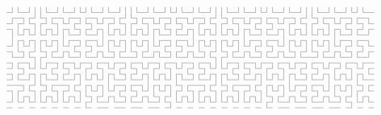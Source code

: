 \vskip 1cm
$$
\hbox
{
\vbox{\lineskip = 0pt \baselineskip = 0pt
      \hbox{\z\j\l\z\j\j\j\l\z\j\l\z\j\l\j\l\z\j\l\z\j\j\j\l\z\j\l\z\j\l\j\l\z\j\l\z\j\j\j\l\z\j\l\z\j\l\j\l\z\j\l\z\j\j\j\l\z\j\l\z\j\l\j\l\z}
      \hbox{\n\z\z\o\z\j\l\o\z\z\o\z\z\o\z\z\o\z\z\o\z\j\l\o\z\z\o\z\z\o\z\z\o\z\z\o\z\j\l\o\z\z\o\z\z\o\z\z\o\z\z\o\z\j\l\o\z\z\o\z\z\o\z\z\o}
      \hbox{\z\j\z\j\l\o\z\j\l\o\l\j\z\j\l\o\l\j\z\j\l\o\z\j\l\o\l\j\z\j\l\o\l\j\z\j\l\o\z\j\l\o\l\j\z\j\l\o\l\j\z\j\l\o\z\j\l\o\l\j\z\j\l\o\l}
      \hbox{\z\o\j\z\o\j\j\z\o\j\z\o\l\o\z\j\z\o\j\z\o\j\j\z\o\j\z\o\l\o\z\j\z\o\j\z\o\j\j\z\o\j\z\o\l\o\z\j\z\o\j\z\o\j\j\z\o\j\z\o\l\o\z\j\z}
      \hbox{\n\j\l\j\l\j\l\j\l\j\j\l\z\j\l\z\j\j\l\j\l\j\l\j\l\j\j\l\z\j\l\z\j\j\l\j\l\j\l\j\l\j\j\l\z\j\l\z\j\j\l\j\l\j\l\j\l\j\j\l\z\j\l\z\j}
      \hbox{\n\j\z\o\z\o\z\o\z\o\j\z\z\o\z\z\o\j\z\o\z\o\z\o\z\o\j\z\z\o\z\z\o\j\z\o\z\o\z\o\z\o\j\z\z\o\z\z\o\j\z\o\z\o\z\o\z\o\j\z\z\o\z\z\o}
      \hbox{\z\j\j\l\j\j\j\l\j\j\l\j\z\j\l\o\l\j\j\l\j\j\j\l\j\j\l\j\z\j\l\o\l\j\j\l\j\j\j\l\j\j\l\j\z\j\l\o\l\j\j\l\j\j\j\l\j\j\l\j\z\j\l\o\l}
      \hbox{\z\o\l\o\z\j\l\o\z\j\z\o\l\o\z\j\z\o\l\o\z\j\l\o\z\j\z\o\l\o\z\j\z\o\l\o\z\j\l\o\z\j\z\o\l\o\z\j\z\o\l\o\z\j\l\o\z\j\z\o\l\o\z\j\z}
      \hbox{\n\l\z\j\l\o\z\j\l\z\j\l\z\j\l\z\j\l\z\j\l\z\z\j\l\z\j\l\z\j\l\z\j\l\z\j\l\o\z\j\l\z\j\l\z\j\l\z\j\l\z\j\l\z\z\j\l\z\j\l\z\j\l\z\j}
      \hbox{\z\o\z\z\o\j\j\z\z\o\z\z\o\z\z\o\z\z\o\z\z\o\z\z\o\z\z\o\z\z\o\z\z\o\z\z\o\j\j\z\z\o\z\z\o\z\z\o\z\z\o\z\z\o\z\z\o\z\z\o\z\z\o\z\z}
      \hbox{\z\j\l\o\l\j\l\j\z\j\l\o\l\j\z\j\l\o\l\j\z\j\l\o\l\j\z\j\l\o\l\j\z\j\l\o\l\j\l\j\z\j\l\o\l\j\z\j\l\o\l\j\z\j\l\o\l\j\z\j\l\o\l\j\z}
      \hbox{\z\o\z\j\z\o\z\o\l\o\z\j\z\o\j\z\o\j\z\o\l\o\z\j\z\o\j\z\o\j\z\o\l\o\z\j\z\o\z\o\l\o\z\j\z\o\j\z\o\j\z\o\l\o\z\j\z\o\j\z\o\j\z\o\l}
      \hbox{\z\j\l\z\j\j\j\l\z\j\l\z\j\j\l\j\l\j\j\l\z\j\l\z\j\j\l\j\l\j\j\l\z\j\l\z\j\j\j\l\z\j\l\z\j\j\l\j\l\j\j\l\z\j\l\z\j\j\l\j\l\j\j\l\z}
      \hbox{\z\z\z\o\z\j\l\o\z\z\z\o\z\j\z\o\z\o\j\z\z\o\z\z\o\j\z\o\z\o\l\o\z\z\z\o\z\j\l\o\z\z\z\o\z\j\z\o\z\o\j\z\z\o\z\z\o\j\z\o\z\o\l\o\z}
      \hbox{\z\o\z\j\l\o\z\j\l\o\z\j\l\o\j\l\j\j\l\j\z\j\l\o\l\j\j\l\j\j\z\j\l\o\z\j\l\o\z\j\l\o\z\j\l\o\j\l\j\j\l\j\z\j\l\o\l\j\j\l\j\j\z\j\l}
      \hbox{\n\j\j\z\o\j\j\z\o\j\j\z\o\j\l\o\z\j\z\o\l\o\z\j\z\o\l\o\z\j\j\z\o\j\j\z\o\j\j\z\o\j\j\z\o\j\l\o\z\j\z\o\l\o\z\j\z\o\l\o\z\j\j\z\o}
      \hbox{\z\j\l\j\l\j\l\j\l\j\l\j\l\j\z\j\l\z\j\l\z\j\l\z\j\l\z\j\l\o\l\j\l\j\l\j\l\j\l\j\l\j\l\j\l\j\z\j\l\z\j\l\z\j\l\z\j\l\z\j\l\o\l\j\l}
      \hbox{\z\o\z\o\z\o\z\o\z\o\z\o\z\o\l\o\z\z\o\z\z\o\z\z\o\z\z\o\z\j\z\o\z\o\z\o\z\o\z\o\z\o\z\o\z\o\l\o\z\z\o\z\z\o\z\z\o\z\z\o\z\j\z\o\z}
}}$$
